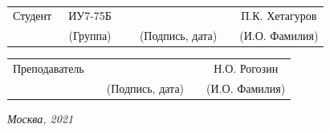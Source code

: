 \noindent
{}


\noindent
{}
\\

\vspace{1.5cm}
\noindent
\begin{tabular}{l c c c c c}
    Студент      & ~ИУ7-75Б~               & \hspace{3.5cm} & \hspace{3.5cm}                 & &  П.К. Хетагуров \\\cline{2-2}\cline{4-4} \cline{6-6} 
    \hspace{3cm} & {\footnotesize(Группа)} &                & {\footnotesize(Подпись, дата)} & & {\footnotesize(И.О. Фамилия)}
\end{tabular}

\vspace{1cm}

\noindent
\begin{tabular}{l c c c c}
    Преподаватель & \hspace{6cm}   & \hspace{3.5cm}                 & &  Н.О. Рогозин \\\cline{3-3} \cline{5-5} 
    \hspace{3cm}  &                & {\footnotesize(Подпись, дата)} & & {\footnotesize(И.О. Фамилия)}
\end{tabular}

\begin{center}	
	\vfill
	\large \textit {Москва, 2021}
\end{center}

\thispagestyle {empty}
\pagebreak